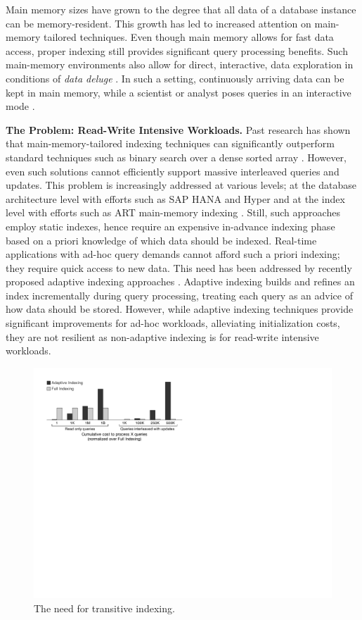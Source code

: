 \documentclass{sig-alternate}
\begin{document}
Main memory sizes have grown to the degree that all data of a database instance can be memory-resident. This growth has led to increased attention on main-memory tailored techniques. Even though main memory allows for fast data access, proper indexing still provides significant query processing benefits. Such main-memory environments also allow for direct, interactive, data exploration in conditions of {\em data deluge} \cite{SurajitSigmod2012Keynote}. In such a setting, continuously arriving data can be kept in main memory, while a scientist or analyst poses queries in an interactive mode \cite{NoDBcidr,Blinkmit,ResearcherGuide,Sciborg}.

\textbf{The Problem: Read-Write Intensive Workloads.}
Past research has shown that main-memory-tailored indexing techniques can significantly outperform
standard techniques such as binary search over a dense sorted array \cite{cbbtrees,art}. However, even such solutions cannot efficiently support massive interleaved queries and updates. This problem is increasingly addressed at various levels; at the database architecture level with efforts such as SAP HANA \cite{Hana} and Hyper \cite{hyper} and at the index level with efforts such as ART main-memory indexing \cite{art}. Still, such approaches employ static indexes, hence require an expensive in-advance indexing phase based on a priori knowledge of which data should be indexed. Real-time applications with ad-hoc query demands cannot afford such a priori indexing; they require quick access to new data. This need has been addressed by recently proposed adaptive indexing approaches \cite{IKM:CIDR07,hail}. Adaptive indexing builds and refines an index incrementally during query processing, treating each query as an advice of how data should be stored. However, while adaptive indexing techniques provide significant improvements for ad-hoc workloads, alleviating initialization costs, they are not resilient as non-adaptive indexing is for read-write intensive workloads.

\begin{figure}[ht]
\vspace{-3mm}
\center
\includegraphics[width=0.85\columnwidth]{graphs/motivation.pdf}%
\caption{The need for transitive indexing.}\label{F:Motivation}
\vspace{-3mm}
\end{figure}
\end{document}
